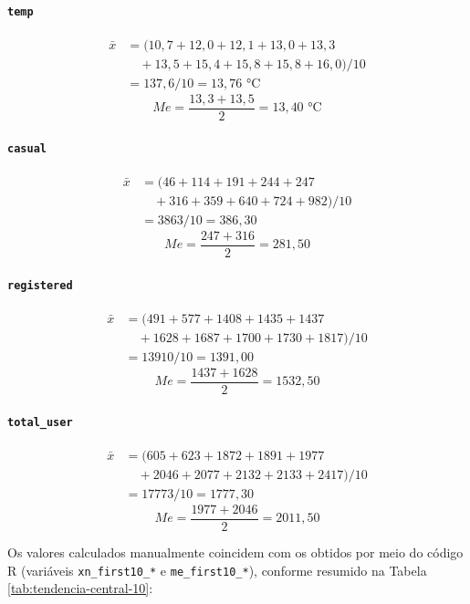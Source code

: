 \documentclass[10pt, a4paper]{article}
\begin{document}
\paragraph{\texttt{temp}}
\[
\begin{split}
\bar{x} &= \big(10{,}7+12{,}0+12{,}1+13{,}0+13{,}3 \\
&\quad{} +13{,}5+15{,}4+15{,}8+15{,}8+16{,}0\big)/10 \\
&= 137{,}6/10 = 13{,}76 \text{ °C}
\end{split}
\]
\[
Me = \frac{13{,}3 + 13{,}5}{2} = 13{,}40 \text{ °C}
\]

\paragraph{\texttt{casual}}
\[
\begin{split}
\bar{x} &= \big(46+114+191+244+247 \\
&\quad{} +316+359+640+724+982\big)/10 \\
&= 3863/10 = 386{,}30
\end{split}
\]
\[
Me = \frac{247 + 316}{2} = 281{,}50
\]

\paragraph{\texttt{registered}}
\[
\begin{split}
\bar{x} &= \big(491+577+1408+1435+1437 \\
&\quad{} +1628+1687+1700+1730+1817\big)/10 \\
&= 13910/10 = 1391{,}00
\end{split}
\]
\[
Me = \frac{1437 + 1628}{2} = 1532{,}50
\]

\paragraph{\texttt{total\_user}}
\[
\begin{split}
\bar{x} &= \big(605+623+1872+1891+1977 \\
&\quad{} +2046+2077+2132+2133+2417\big)/10 \\
&= 17773/10 = 1777{,}30
\end{split}
\]
\[
Me = \frac{1977 + 2046}{2} = 2011{,}50
\]

Os valores calculados manualmente coincidem com os obtidos por meio do código R (variáveis \texttt{xn\_first10\_*} e \texttt{me\_first10\_*}), conforme resumido na Tabela \ref{tab:tendencia-central-10}:
\end{document}
